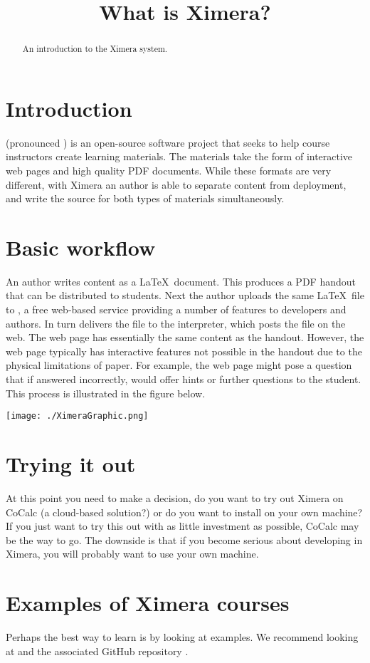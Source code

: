 \documentclass{ximera}
\title{What is Ximera?}
\begin{document}
\begin{abstract}
An introduction to the Ximera system.
\end{abstract}
\maketitle


\section{Introduction}

 (pronounced ) is an
open-source software project that seeks to help course instructors
create learning materials.  The materials take the form of interactive
web pages and high quality PDF documents.  While these formats are
very different, with Ximera an author is able to separate content from
deployment, and write the source for both types of materials
simultaneously.

\section{Basic workflow}

An author writes content as a \LaTeX\ document.  This produces a PDF
handout that can be distributed to students.  Next the author uploads
the same \LaTeX\ file to , a free
web-based service providing a number of features to developers and
authors.  In turn  delivers the
file to the  interpreter, which
posts the file on the web.  The web page has essentially the same
content as the handout.  However, the web page typically has
interactive features not possible in the handout due to the physical
limitations of paper.  For example, the web page might pose a question
that if answered incorrectly, would offer hints or further questions
to the student.  This process is illustrated in the figure below.

\begin{image}
\texttt{[image: ./XimeraGraphic.png]}
\end{image}

\section{Trying it out}

At this point you need to make a decision, do you want to try out
Ximera on CoCalc (a cloud-based solution?) or do you want to install
on your own machine?  If you just want to try this out with as little
investment as possible, CoCalc may be the way to go. The downside is
that if you become serious about developing in Ximera, you will
probably want to use your own machine.

\section{Examples of Ximera courses}

Perhaps the best way to learn is by looking at examples. We recommend
looking at  and the
associated GitHub repository .
\end{document}
